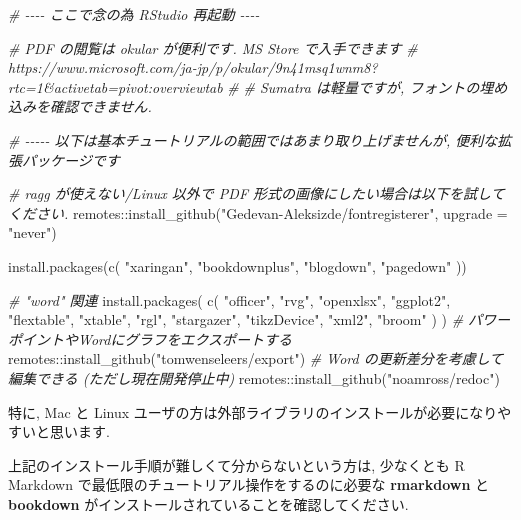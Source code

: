 \documentclass[
]{ltjsarticle}
\newenvironment{Shaded}{\begin{snugshade}}{\end{snugshade}}
\newcommand{\AttributeTok}[1]{\textcolor[rgb]{0.77,0.63,0.00}{#1}}
\newcommand{\CommentTok}[1]{\textcolor[rgb]{0.56,0.35,0.01}{\textit{#1}}}
\newcommand{\FunctionTok}[1]{\textcolor[rgb]{0.00,0.00,0.00}{#1}}
\newcommand{\NormalTok}[1]{#1}
\newcommand{\SpecialCharTok}[1]{\textcolor[rgb]{0.00,0.00,0.00}{#1}}
\newcommand{\StringTok}[1]{\textcolor[rgb]{0.31,0.60,0.02}{#1}}
\newenvironment{infobox}[1]{\begin{itemize}\renewcommand{\labelitemi}{\raisebox{-.7\height}[0pt][0pt]{%
  {\setkeys{Gin}{width=3em,keepaspectratio}\texttt{[image: \_latex/\_img/\#1]}}}}
  \setlength{\fboxsep}{1em}
  \begin{greyblock}
  \item
  }{\end{greyblock}\end{itemize}
}
\begin{document}
\begin{Shaded}
\begin{Highlighting}[numbers=left,,]
\CommentTok{\# {-}{-}{-}{-} ここで念の為 RStudio 再起動 {-}{-}{-}{-}}

\CommentTok{\# PDF の閲覧は okular が便利です. MS Store で入手できます}
\CommentTok{\# https://www.microsoft.com/ja{-}jp/p/okular/9n41msq1wnm8?rtc=1\&activetab=pivot:overviewtab}
\CommentTok{\#}
\CommentTok{\# Sumatra は軽量ですが, フォントの埋め込みを確認できません.}


\CommentTok{\# {-}{-}{-}{-}{-} 以下は基本チュートリアルの範囲ではあまり取り上げませんが, 便利な拡張パッケージです}

\CommentTok{\# ragg が使えない/Linux 以外で PDF 形式の画像にしたい場合は以下を試してください.}
\NormalTok{remotes}\SpecialCharTok{::}\FunctionTok{install\_github}\NormalTok{(}\StringTok{"Gedevan{-}Aleksizde/fontregisterer"}\NormalTok{, }\AttributeTok{upgrade =} \StringTok{"never"}\NormalTok{)}

\FunctionTok{install.packages}\NormalTok{(}\FunctionTok{c}\NormalTok{(}
  \StringTok{"xaringan"}\NormalTok{,}
  \StringTok{"bookdownplus"}\NormalTok{,}
  \StringTok{"blogdown"}\NormalTok{,}
  \StringTok{"pagedown"}
\NormalTok{))}

\CommentTok{\# "word" 関連}
\FunctionTok{install.packages}\NormalTok{(}
  \FunctionTok{c}\NormalTok{(}
    \StringTok{"officer"}\NormalTok{, }\StringTok{"rvg"}\NormalTok{, }\StringTok{"openxlsx"}\NormalTok{,}
    \StringTok{"ggplot2"}\NormalTok{, }\StringTok{"flextable"}\NormalTok{, }\StringTok{"xtable"}\NormalTok{, }\StringTok{"rgl"}\NormalTok{, }\StringTok{"stargazer"}\NormalTok{,}
    \StringTok{"tikzDevice"}\NormalTok{, }\StringTok{"xml2"}\NormalTok{, }\StringTok{"broom"}
\NormalTok{  )}
\NormalTok{)}
\CommentTok{\# パワーポイントやWordにグラフをエクスポートする}
\NormalTok{remotes}\SpecialCharTok{::}\FunctionTok{install\_github}\NormalTok{(}\StringTok{"tomwenseleers/export"}\NormalTok{)}
\CommentTok{\# Word の更新差分を考慮して編集できる (ただし現在開発停止中)}
\NormalTok{remotes}\SpecialCharTok{::}\FunctionTok{install\_github}\NormalTok{(}\StringTok{"noamross/redoc"}\NormalTok{)}
\end{Highlighting}
\end{Shaded}

特に, Mac と Linux ユーザの方は外部ライブラリのインストールが必要になりやすいと思います.

\begin{infobox}{important}
上記のインストール手順が難しくて分からないという方は, 少なくとも R Markdown で最低限のチュートリアル操作をするのに必要な \textbf{rmarkdown} と \textbf{bookdown} がインストールされていることを確認してください.

\end{infobox}
\end{document}
